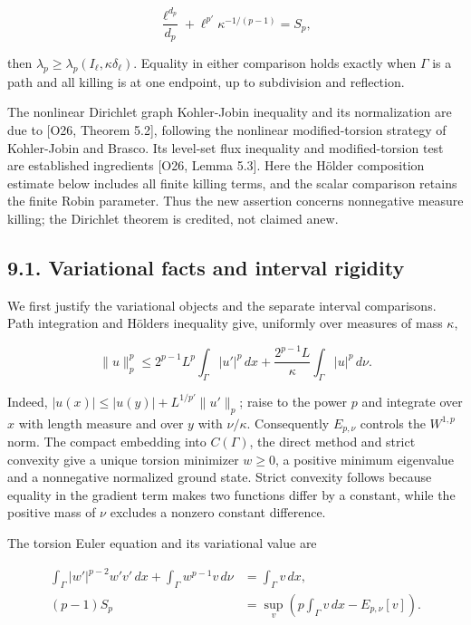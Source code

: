 \documentclass[11pt]{article}
\begin{document}
\[
\frac{\ell^{d_p}}{d_p}
+\ell^{p'}\kappa^{-1/(p-1)}=S_p,
\tag{94}
\]

then \(\lambda_p\ge\lambda_p(I_\ell,\kappa\delta_\ell)\). Equality in
either comparison holds exactly when \(\Gamma\) is a path and all
killing is at one endpoint, up to subdivision and reflection.

The nonlinear Dirichlet graph Kohler-Jobin inequality and its
normalization are due to {[}O26, Theorem 5.2{]}, following the nonlinear
modified-torsion strategy of Kohler-Jobin and Brasco. Its level-set flux
inequality and modified-torsion test are established ingredients {[}O26,
Lemma 5.3{]}. Here the Hölder composition estimate below includes all
finite killing terms, and the scalar comparison retains the finite Robin
parameter. Thus the new assertion concerns nonnegative measure killing;
the Dirichlet theorem is credited, not claimed anew.

\subsection{9.1. Variational facts and interval
rigidity}\label{variational-facts-and-interval-rigidity}

We first justify the variational objects and the separate interval
comparisons. Path integration and Hölder\textquotesingle s inequality
give, uniformly over measures of mass \(\kappa\),

\[
\|u\|_p^p
\le 2^{p-1}L^p\int_\Gamma|u'|^p\,dx
 +\frac{2^{p-1}L}{\kappa}\int_\Gamma|u|^p\,d\nu.
\tag{95}
\]

Indeed, \(|u(x)|\le |u(y)|+L^{1/p'}\|u'\|_p\); raise to the power \(p\)
and integrate over \(x\) with length measure and over \(y\) with
\(\nu/\kappa\). Consequently \(E_{p,\nu}\) controls the \(W^{1,p}\)
norm. The compact embedding into \(C(\Gamma)\), the direct method and
strict convexity give a unique torsion minimizer \(w\ge0\), a positive
minimum eigenvalue and a nonnegative normalized ground state. Strict
convexity follows because equality in the gradient term makes two
functions differ by a constant, while the positive mass of \(\nu\)
excludes a nonzero constant difference.

The torsion Euler equation and its variational value are

\[
\begin{aligned}
\int_\Gamma|w'|^{p-2}w'v'\,dx
 +\int_\Gamma w^{p-1}v\,d\nu&=\int_\Gamma v\,dx,\\
(p-1)S_p&=\sup_v\left(p\int_\Gamma v\,dx-E_{p,\nu}[v]\right).
\end{aligned}
\tag{96}
\]
\end{document}
